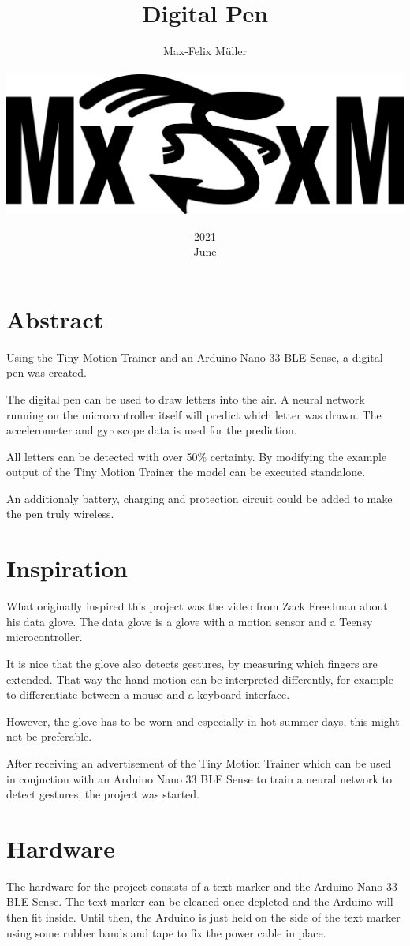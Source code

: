 \documentclass[a4paper,titlepage]{article}
\title{Digital Pen}
\date{2021\\ June}
\author{Max-Felix Müller\\ \\ \includegraphics[width=\textwidth]{mxfxm.png}}
\begin{document}
\maketitle
\tableofcontents
\newpage
\listoffigures %
\newpage

\section*{Abstract}

Using the Tiny Motion Trainer and an Arduino Nano 33 BLE Sense, a digital pen was created.

The digital pen can be used to draw letters into the air.
A neural network running on the microcontroller itself will predict which letter was drawn.
The accelerometer and gyroscope data is used for the prediction.

All letters can be detected with over 50\% certainty.
By modifying the example output of the Tiny Motion Trainer the model can be executed standalone.

An additionaly battery, charging and protection circuit could be added to make the pen truly wireless.

\newpage
\section{Inspiration}

What originally inspired this project was the video from Zack Freedman about his data glove.
The data glove is a glove with a motion sensor and a Teensy microcontroller.

It is nice that the glove also detects gestures, by measuring which fingers are extended.
That way the hand motion can be interpreted differently, for example to differentiate between a mouse and a keyboard interface.

However, the glove has to be worn and especially in hot summer days, this might not be preferable.

After receiving an advertisement of the Tiny Motion Trainer which can be used in conjuction with an Arduino Nano 33 BLE Sense to train a neural network to detect gestures, the project was started.

\section{Hardware}

The hardware for the project consists of a text marker and the Arduino Nano 33 BLE Sense.
The text marker can be cleaned once depleted and the Arduino will then fit inside.
Until then, the Arduino is just held on the side of the text marker using some rubber bands and tape to fix the power cable in place.
\end{document}
